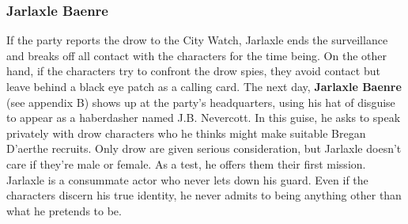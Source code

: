 \documentclass[10pt,a4paper,twoside,twocolumn,openany,nodeprecatedcode]{dndbook}
\begin{document}
\subsubsection{Jarlaxle Baenre}
If the party reports the drow to the City Watch, Jarlaxle ends the surveillance and breaks off all contact with the characters for the time being.
On the other hand, if the characters try to confront the drow spies, they avoid contact but leave behind a black eye patch as a calling card. The next day, \textbf{Jarlaxle Baenre} (see appendix B) shows up at the party's headquarters, using his hat of disguise to appear as a haberdasher named J.B. Nevercott. In this guise, he asks to speak privately with drow characters who he thinks might make suitable Bregan D'aerthe recruits. Only drow are given serious consideration, but Jarlaxle doesn't care if they're male or female. As a test, he offers them their first mission.
Jarlaxle is a consummate actor who never lets down his guard. Even if the characters discern his true identity, he never admits to being anything other than what he pretends to be.
\end{document}

